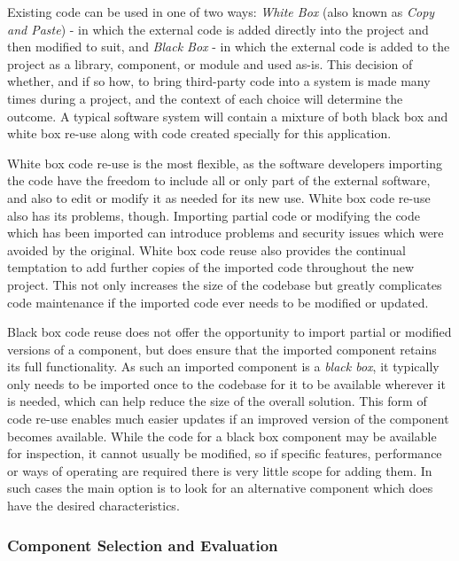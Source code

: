 Existing code can be used in one of two ways: \emph{White Box} (also known as \emph{Copy and Paste}) - in which the external code is added directly into the project and then modified to suit, and \emph{Black Box} - in which the external code is added to the project as a library, component, or module and used as-is. This decision of whether, and if so how, to bring third-party code into a system is made many times during a project, and the context of each choice will determine the outcome. A typical software system will contain a mixture of both black box and white box re-use along with code created specially for this application.

White box code re-use is the most flexible, as the software developers importing the code have the freedom to include all or only part of the external software, and also to edit or modify it as needed for its new use. White box code re-use also has its problems, though. Importing partial code or modifying the code which has been imported can introduce problems and security issues which were avoided by the original. White box code reuse also provides the continual temptation to add further copies of the imported code throughout the new project. This not only increases the size of the codebase but greatly complicates code maintenance if the imported code ever needs to be modified or updated.

Black box code reuse does not offer the opportunity to import partial or modified versions of a component, but does ensure that the imported component retains its full functionality. As such an imported component is a \emph{black box}, it typically only needs to be imported once to the codebase for it to be available wherever it is needed, which can help reduce the size of the overall solution. This form of code re-use enables much easier updates if an improved version of the component becomes available. While the code for a black box component may be available for inspection, it cannot usually be modified, so if specific features, performance or ways of operating are required there is very little scope for adding them. In such cases the main option is to look for an alternative component which does have the desired characteristics.

\subsubsection{Component Selection and Evaluation}

